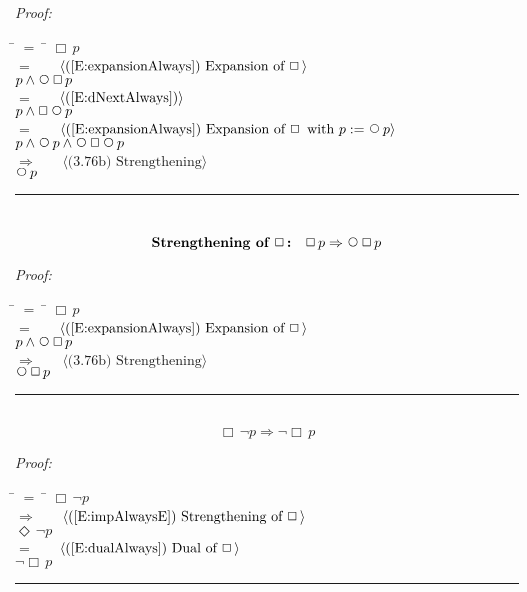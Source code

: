 \documentclass[fleqn, leqno]{article}
\newcommand{\lgap}{2pt} %
\newcommand{\mymathindent}{24pt} %
\newcommand{\Next}{\;\,\text{\raisebox{3.5pt}{\circle{6}}}}
\newcommand{\Event}{\Diamond\,}
\newcommand{\Always}{\Box\,}
\newcommand{\myqed}{\hfill\rule[-.23ex]{1.2ex}{2.0ex}}
\newcommand{\Gll} {\langle} %
\newcommand{\Ggg} {\rangle} %
\newcommand{\Hint}[1] {\ \ \ $\Gll \mbox{#1} \Ggg$ } %
\begin{document}
\emph{Proof:}
\begin{tabbing}
\hspace{\mymathindent} \= $= \;$ \= \kill
\> \> $\Always p$\\[\lgap]
\> $=$ \> \Hint{(\ref{E:expansionAlways}) Expansion of $\Always$}\\[\lgap]
\> \> $p \land \Next\Always p$\\[\lgap]
\> $=$ \> \Hint{(\ref{E:dNextAlways})}\\[\lgap]
\> \> $p \land \Always\Next p$\\[\lgap]
\> $=$ \> \Hint{(\ref{E:expansionAlways}) Expansion of $\Always$ with $p := \Next p$}\\[\lgap]
\> \> $p \land \Next p \land \Next\Always\Next p$\\[\lgap]
\> $\Rightarrow$ \> \Hint{(3.76b) Strengthening}\\[\lgap]
\> \> $\Next p$\\[\lgap]
\end{tabbing}
\myqed\\[\lgap]


\begin{equation}\label{E:impAlwaysNA}
\textbf{Strengthening of $\Always$:}\quad \Always p \Rightarrow \Next\Always p
\end{equation}

\emph{Proof:}
\begin{tabbing}
\hspace{\mymathindent} \= $= \;$ \= \kill
\> \> $\Always p$\\[\lgap]
\> $=$ \> \Hint{(\ref{E:expansionAlways}) Expansion of $\Always$}\\[\lgap]
\> \> $p \land \Next\Always p$\\[\lgap]
\> $\Rightarrow$ \> \Hint{(3.76b) Strengthening}\\[\lgap]
\> \> $\Next\Always p$\\[\lgap]
\end{tabbing}
\myqed\\[\lgap]


\begin{equation}\label{E:exAlwaysNot}
\Always\lnot p \Rightarrow \lnot\Always p
\end{equation}

\emph{Proof:}
\begin{tabbing}
\hspace{\mymathindent} \= $= \;$ \= \kill
\> \> $\Always\lnot p$\\[\lgap]
\> $\Rightarrow$ \> \Hint{(\ref{E:impAlwaysE}) Strengthening of $\Always$}\\[\lgap]
\> \> $\Event\lnot p$\\[\lgap]
\> $=$ \> \Hint{(\ref{E:dualAlways}) Dual of $\Always$}\\[\lgap]
\> \> $\lnot\Always p$\\[\lgap]
\end{tabbing}
\myqed\\[\lgap]
\end{document}
